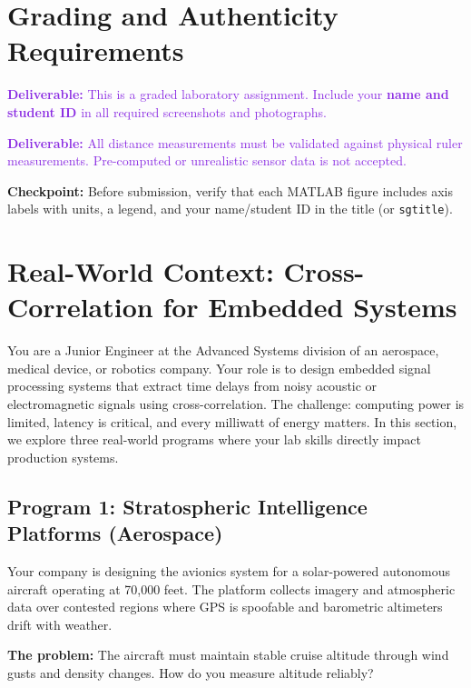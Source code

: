 \documentclass[11pt,letterpaper]{article}
\providecommand{\cpECE}[1]{\textcolor{OliveGreen}{\textbf{Checkpoint:} #1}}
\providecommand{\delECE}[1]{\textcolor{BlueViolet}{\textbf{Deliverable:} #1}}
\begin{document}
\clearpage

\section*{Grading and Authenticity Requirements}
\delECE{This is a graded laboratory assignment. Include your \textbf{name and student ID} in all required screenshots and photographs.}

\delECE{All distance measurements must be validated against physical ruler measurements. Pre-computed or unrealistic sensor data is not accepted.}

\cpECE{Before submission, verify that each MATLAB figure includes axis labels with units, a legend, and your name/student ID in the title (or \texttt{sgtitle}).}

\clearpage

\section{Real-World Context: Cross-Correlation for Embedded Systems}

\noindent
You are a Junior Engineer at the Advanced Systems division of an aerospace, medical device, or robotics company. Your role is to design embedded signal processing systems that extract time delays from noisy acoustic or electromagnetic signals using cross-correlation. The challenge: computing power is limited, latency is critical, and every milliwatt of energy matters. In this section, we explore three real-world programs where your lab skills directly impact production systems.

\subsection{Program 1: Stratospheric Intelligence Platforms (Aerospace)}

Your company is designing the avionics system for a solar-powered autonomous aircraft operating at 70,000 feet. The platform collects imagery and atmospheric data over contested regions where GPS is spoofable and barometric altimeters drift with weather.

\textbf{The problem:} The aircraft must maintain stable cruise altitude through wind gusts and density changes. How do you measure altitude reliably?
\end{document}
